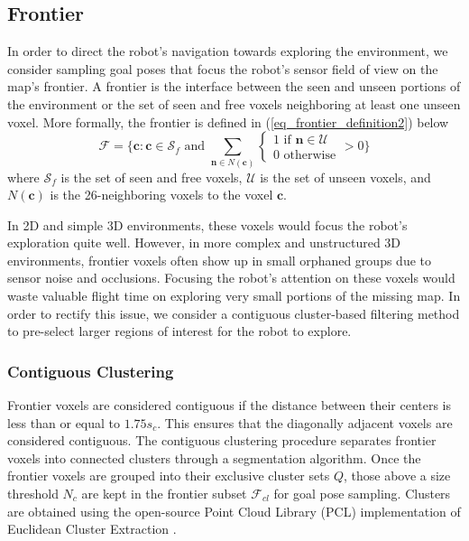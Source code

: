 \documentclass[letterpaper, 10 pt, conference]{ieeeconf}  %
\begin{document}
\subsection{Frontier}
In order to direct the robot's navigation towards exploring the environment, we consider sampling goal poses that focus the robot's sensor field of view on the map's frontier. A frontier is the interface between the seen and unseen portions of the environment or the set of seen and free voxels neighboring at least one unseen voxel.  More formally, the frontier is defined in (\ref{eq_frontier_definition2}) below
\begin{equation}
\label{eq_frontier_definition2}
    \mathcal{F} = \{\bm{c} : \bm{c} \in \mathcal{S}_f \text{ and } \sum_{\bm{n} \in N(\bm{c})} \begin{cases}
        1 \text{ if } \bm{n} \in \mathcal{U} \\
        0 \text{ otherwise}
    \end{cases}
    > 0\}
\end{equation}
where $\mathcal{S}_f$ is the set of seen and free voxels, $\mathcal{U}$ is the set of unseen voxels, and $N(\bm{c})$ is the 26-neighboring voxels to the voxel $\bm{c}$.

In 2D and simple 3D environments, these voxels would focus the robot's exploration quite well. However, in more complex and unstructured 3D environments, frontier voxels often show up in small orphaned groups due to sensor noise and occlusions. Focusing the robot's attention on these voxels would waste valuable flight time on exploring very small portions of the missing map. In order to rectify this issue, we consider a contiguous cluster-based filtering method to pre-select larger regions of interest for the robot to explore.

\subsubsection{Contiguous Clustering}

Frontier voxels are considered contiguous if the distance between their centers is less than or equal to $1.75s_c$. This ensures that the diagonally adjacent voxels are considered contiguous. The contiguous clustering procedure separates frontier voxels into connected clusters through a segmentation algorithm. Once the frontier voxels are grouped into their exclusive cluster sets $Q$, those above a size threshold $N_c$ are kept in the frontier subset $\mathcal{F}_{cl}$ for goal pose sampling.  Clusters are obtained using the open-source Point Cloud Library (PCL) implementation of Euclidean Cluster Extraction \cite{Rusu_ICRA2011_PCL}.
\end{document}
